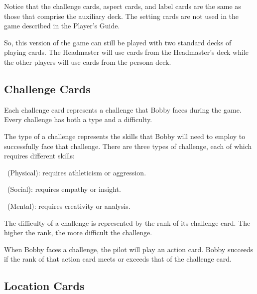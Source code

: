 \documentclass[a4paper, 10pt,notumble]{leaflet}
\DeclareRobustCommand\spades[1][black]{\textcolor{#1}{\cardfont{\}}}}
\DeclareRobustCommand\hearts[1][red]{\textcolor{#1}{{\cardfont{\{}}}}
\DeclareRobustCommand\clubs[1][black]{\textcolor{#1}{\cardfont{]}}}
\begin{document}
Notice that the challenge cards, aspect cards, and label cards are the same as those that comprise the auxiliary deck. The setting cards are not used in the game described in the Player's Guide.

So, this version of the game can still be played with two standard decks of playing cards. The Headmaster will use cards from the Headmaster's deck while the other players will use cards from the persona deck. 


\newpage
\subsection{Challenge Cards}
Each challenge card represents a challenge that Bobby faces during the game. Every challenge has both a type and a difficulty.

The type of a challenge represents the skills that Bobby will need to employ to successfully face that challenge. There are three types of challenge, each of which requires different skills:
\begin{challengetypelist}[itemsep=0pt]
	\item[\clubs\ (Physical):] requires athleticism or aggression. 
	\item[\hearts\ (Social):] requires empathy or insight.
	\item[\spades\ (Mental):] requires creativity or analysis.
\end{challengetypelist}

The difficulty of a challenge is represented by the rank of its challenge card. The higher the rank, the more difficult the challenge.

When Bobby faces a challenge, the pilot will play an action card. Bobby succeeds if the rank of that action card meets or exceeds that of the challenge card.

\subsection{Location Cards}
\end{document}
